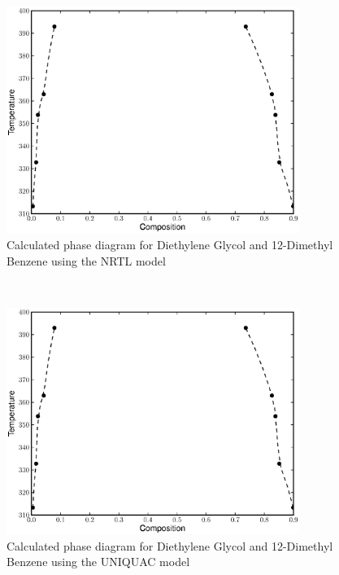 \begin{figure}[hp]
\centering
\includegraphics[width = 0.85\textwidth]{Results_Parts/BinaryParams/diethyleneglycol-12-dimethylbenzene/NRTL/PhaseDiagram.eps}
\caption{Calculated phase diagram for Diethylene Glycol and 12-Dimethyl Benzene using the NRTL model} \label{NRTLdiethyleneglycol-12-dimethylbenzene}
\end{figure}\	

\begin{figure}[hp]
\centering
\includegraphics[width = 0.85\textwidth]{Results_Parts/BinaryParams/diethyleneglycol-12-dimethylbenzene/UNIQUAC/PhaseDiagram.eps}
\caption{Calculated phase diagram for Diethylene Glycol and 12-Dimethyl Benzene using the UNIQUAC model} \label{UNIQUACdiethyleneglycol-12-dimethylbenzene}
\end{figure}\	

\clearpage


